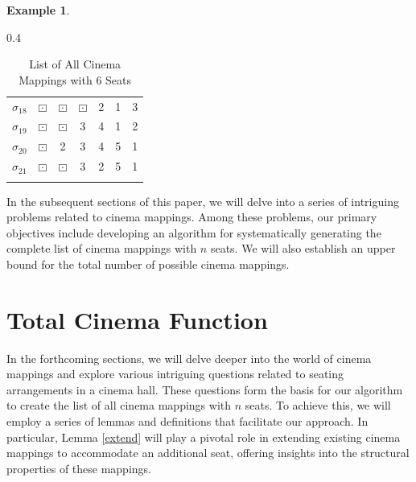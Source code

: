 \documentclass{amsart}
\theoremstyle{definition}
\newtheorem{example}[theorem]{Example}
\begin{document}
\begin{example}
\begin{table}[H]
\begin{subtable}[r]{0.4\textwidth}
\begin{tabular}{ r | c c c c c c}
            $\sigma_{18}$ & $\boxdot$ & $\boxdot$ & $\boxdot$ & 2 & 1 & 3 \\
            $\sigma_{19}$ & $\boxdot$ & $\boxdot$ & 3 & 4 & 1 & 2 \\
            $\sigma_{20}$ & $\boxdot$ & 2 & 3 & 4 & 5 & 1 \\
            $\sigma_{21}$ & $\boxdot$ & $\boxdot$ & 3 & 2 & 5 & 1 \\
            &&&&&&
        \end{tabular}
\end{subtable}
\caption{List of All Cinema Mappings with $6$ Seats}
\end{table}
\end{example}

In the subsequent sections of this paper, we will delve into a series of intriguing problems related to cinema mappings. Among these problems, our primary objectives include developing an algorithm for systematically generating the complete list of cinema mappings with $n$ seats. We will also establish an upper bound for the total number of possible cinema mappings. 

\section{Total Cinema Function}

In the forthcoming sections, we will delve deeper into the world of cinema mappings and explore various intriguing questions related to seating arrangements in a cinema hall. These questions form the basis for our algorithm to create the list of all cinema mappings with $n$ seats. To achieve this, we will employ a series of lemmas and definitions that facilitate our approach. In particular, Lemma \ref{extend} will play a pivotal role in extending existing cinema mappings to accommodate an additional seat, offering insights into the structural properties of these mappings.
\end{document}
